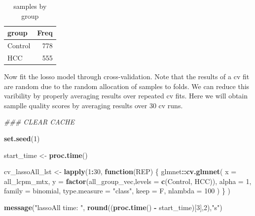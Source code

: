 \documentclass[
]{book}
\newenvironment{Shaded}{\begin{snugshade}}{\end{snugshade}}
\newcommand{\CommentTok}[1]{\textcolor[rgb]{0.56,0.35,0.01}{\textit{#1}}}
\newcommand{\ControlFlowTok}[1]{\textcolor[rgb]{0.13,0.29,0.53}{\textbf{#1}}}
\newcommand{\DataTypeTok}[1]{\textcolor[rgb]{0.13,0.29,0.53}{#1}}
\newcommand{\DecValTok}[1]{\textcolor[rgb]{0.00,0.00,0.81}{#1}}
\newcommand{\KeywordTok}[1]{\textcolor[rgb]{0.13,0.29,0.53}{\textbf{#1}}}
\newcommand{\NormalTok}[1]{#1}
\newcommand{\OperatorTok}[1]{\textcolor[rgb]{0.81,0.36,0.00}{\textbf{#1}}}
\newcommand{\StringTok}[1]{\textcolor[rgb]{0.31,0.60,0.02}{#1}}
\begin{document}
\begin{table}

\caption{\label{tab:get-all-data}samples by group}
\centering
\begin{tabular}[t]{l|r}
\hline
group & Freq\\
\hline
Control & 778\\
\hline
HCC & 555\\
\hline
\end{tabular}
\end{table}

Now fit the losso model through cross-validation.
Note that the results of a cv fit are random due to the
random allocation of samples to folds. We can reduce this
varibility by properly averaging results over repeated cv fits.
Here we will obtain samplle quality scores by averaging results
over 30 cv runs.

\begin{Shaded}
\begin{Highlighting}[]
\CommentTok{\#\#\# CLEAR CACHE}

\KeywordTok{set.seed}\NormalTok{(}\DecValTok{1}\NormalTok{)}

\NormalTok{start\_time <{-}}\StringTok{  }\KeywordTok{proc.time}\NormalTok{()}

\NormalTok{cv\_lassoAll\_lst <{-}}\StringTok{ }\KeywordTok{lapply}\NormalTok{(}\DecValTok{1}\OperatorTok{:}\DecValTok{30}\NormalTok{, }\ControlFlowTok{function}\NormalTok{(REP) \{}
\NormalTok{glmnet}\OperatorTok{::}\KeywordTok{cv.glmnet}\NormalTok{(}
 \DataTypeTok{x =}\NormalTok{ all\_lcpm\_mtx,}
 \DataTypeTok{y =} \KeywordTok{factor}\NormalTok{(all\_group\_vec,}\DataTypeTok{levels =} \KeywordTok{c}\NormalTok{(}\StringTok{\textquotesingle{}Control\textquotesingle{}}\NormalTok{, }\StringTok{\textquotesingle{}HCC\textquotesingle{}}\NormalTok{)),}
 \DataTypeTok{alpha =} \DecValTok{1}\NormalTok{,}
 \DataTypeTok{family =} \StringTok{\textquotesingle{}binomial\textquotesingle{}}\NormalTok{,}
 \DataTypeTok{type.measure  =}  \StringTok{"class"}\NormalTok{,}
 \DataTypeTok{keep =}\NormalTok{ F,}
 \DataTypeTok{nlambda =} \DecValTok{100}
\NormalTok{)}
\NormalTok{\}}
\NormalTok{)}

\KeywordTok{message}\NormalTok{(}\StringTok{"lassoAll time: "}\NormalTok{, }\KeywordTok{round}\NormalTok{((}\KeywordTok{proc.time}\NormalTok{() }\OperatorTok{{-}}\StringTok{ }\NormalTok{start\_time)[}\DecValTok{3}\NormalTok{],}\DecValTok{2}\NormalTok{),}\StringTok{"s"}\NormalTok{)}
\end{Highlighting}
\end{Shaded}
\end{document}
